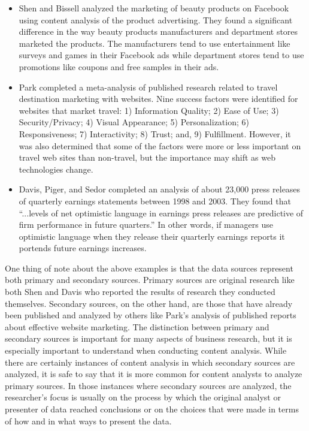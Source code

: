 \begin{itemize}
	\item Shen and Bissell\cite{shen2013social} analyzed the marketing of beauty products on Facebook using content analysis of the product advertising. They found a significant difference in the way beauty products manufacturers and department stores marketed the products. The manufacturers tend to use entertainment like surveys and games in their Facebook ads while department stores tend to use promotions like coupons and free samples in their ads.
	\item Park\cite{park2007success} completed a \gls{meta-analysis} of published research related to travel destination marketing with websites. Nine success factors were identified for websites that market travel: 1) Information Quality; 2) Ease of Use; 3) Security/Privacy; 4) Visual Appearance; 5) Personalization; 6) Responsiveness; 7) Interactivity; 8) Trust; and, 9) Fulfillment. However, it was also determined that some of the factors were more or less important on travel web sites than non-travel, but the importance may shift as web technologies change.
	\item Davis, Piger, and Sedor\cite{davis2012beyond} completed an analysis of about 23,000 press releases of quarterly earnings statements between 1998 and 2003. They found that ``...levels of net optimistic language in earnings press releases are predictive of firm performance in future quarters.'' In other words, if managers use optimistic language when they release their quarterly earnings reports it portends future earnings increases.
\end{itemize} 

One thing of note about the above examples is that the data sources represent both primary and secondary sources. Primary sources are original research like both Shen and Davis who reported the results of research they conducted themselves. Secondary sources, on the other hand, are those that have already been published and analyzed by others like Park's analysis of published reports about effective website marketing. The distinction between primary and secondary sources is important for many aspects of business research, but it is especially important to understand when conducting content analysis. While there are certainly instances of content analysis in which secondary sources are analyzed, it is safe to say that it is more common for content analysts to analyze primary sources. In those instances where secondary sources are analyzed, the researcher's focus is usually on the process by which the original analyst or presenter of data reached conclusions or on the choices that were made in terms of how and in what ways to present the data.

